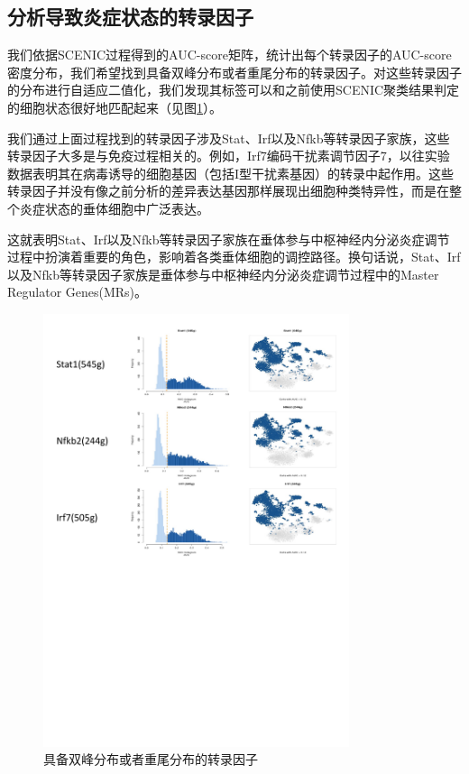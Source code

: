 \subsection{分析导致炎症状态的转录因子}
  我们依据SCENIC过程得到的AUC-score矩阵，统计出每个转录因子的AUC-score密度分布，我们希望找到具备双峰分布或者重尾分布的转录因子。对这些转录因子的分布进行自适应二值化，我们发现其标签可以和之前使用SCENIC聚类结果判定的细胞状态很好地匹配起来（见图\ref{fig:expr-fig3}）。

  我们通过上面过程找到的转录因子涉及Stat、Irf以及Nfkb等转录因子家族，这些转录因子大多是与免疫过程相关的。例如，Irf7编码干扰素调节因子7，以往实验数据表明其在病毒诱导的细胞基因（包括I型干扰素基因）的转录中起作用。这些转录因子并没有像之前分析的差异表达基因那样展现出细胞种类特异性，而是在整个炎症状态的垂体细胞中广泛表达。

  这就表明Stat、Irf以及Nfkb等转录因子家族在垂体参与中枢神经内分泌炎症调节过程中扮演着重要的角色，影响着各类垂体细胞的调控路径。换句话说，Stat、Irf以及Nfkb等转录因子家族是垂体参与中枢神经内分泌炎症调节过程中的Master Regulator Genes(MRs)\cite{mattick2010global}。

\begin{figure}[!htb]
  \centering
  \includegraphics[width=0.8\textwidth]{figs/expr-fig3.pdf}
  \caption{具备双峰分布或者重尾分布的转录因子}
  \label{fig:expr-fig3}
\end{figure}

